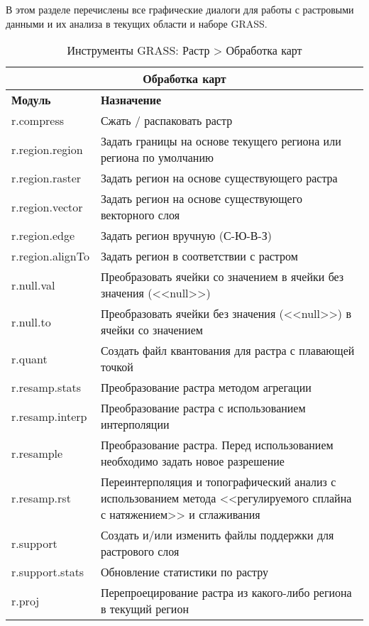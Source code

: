 В этом разделе перечислены все графические диалоги для работы с
растровыми данными и их анализа в текущих области и наборе GRASS.

{\renewcommand{\arraystretch}{0.7}
\begin{table}[H]
\centering
 \begin{tabular}{|p{4cm}|p{10cm}|}
  \hline \multicolumn{2}{|c|}{\textbf{Обработка карт}} \\
  \hline \textbf{Модуль} & \textbf{Назначение} \\
  \hline r.compress & Сжать / распаковать растр \\
  \hline r.region.region & Задать границы на основе текущего региона
  или региона по умолчанию \\
  \hline r.region.raster & Задать регион на основе существующего растра \\
  \hline r.region.vector & Задать регион на основе существующего векторного
  слоя \\
  \hline r.region.edge & Задать регион вручную (С-Ю-В-З) \\
  \hline r.region.alignTo & Задать регион в соответствии с растром \\
  \hline r.null.val & Преобразовать ячейки со значением в ячейки без
  значения (<<null>>) \\
  \hline r.null.to & Преобразовать ячейки без значения (<<null>>) в ячейки
  со значением \\
  \hline r.quant & Создать файл квантования для растра с плавающей точкой \\
  \hline r.resamp.stats & Преобразование растра методом агрегации \\
  \hline r.resamp.interp & Преобразование растра с использованием
  интерполяции \\
  \hline r.resample & Преобразование растра. Перед использованием
  необходимо задать новое разрешение \\
  \hline r.resamp.rst & Переинтерполяция и топографический анализ с
  использованием метода <<регулируемого сплайна с натяжением>> и
  сглаживания \\
  \hline r.support &Создать и/или изменить файлы поддержки для
  растрового слоя \\
  \hline r.support.stats & Обновление статистики по растру \\
  \hline r.proj & Перепроецирование растра из какого-либо региона в
  текущий регион \\
\hline
\end{tabular}
\caption{Инструменты GRASS: Растр > Обработка карт}
\end{table}}

